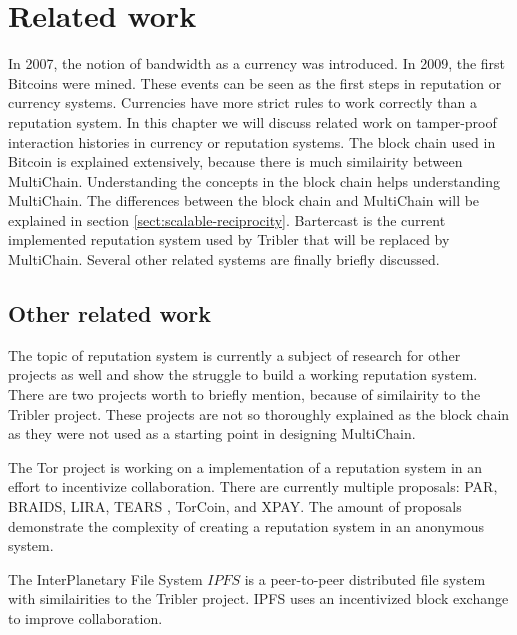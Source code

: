 \chapter{Related work}
In 2007, the notion of bandwidth as a currency was introduced.
In 2009, the first Bitcoins were mined\cite{Blockchain.info-bcs}.
These events can be seen as the first steps in reputation or currency systems.
Currencies have more strict rules to work correctly than a reputation system.
In this chapter we will discuss related work on tamper-proof interaction histories in currency or reputation systems.
The block chain used in Bitcoin is explained extensively,
because there is much similairity between MultiChain.
Understanding the concepts in the block chain helps understanding MultiChain.
The differences between the block chain and MultiChain will be explained in section \ref{sect:scalable-reciprocity}.
Bartercast is the current implemented reputation system used by Tribler that will be replaced by MultiChain.
Several other related systems are finally briefly discussed.





\section{Other related work}
The topic of reputation system is currently a subject of research for other projects as well
and show the struggle to build a working reputation system.
There are two projects worth to briefly mention, because of similairity to the Tribler project.
These projects are not so thoroughly explained as the block chain
as they were not used as a starting point in designing MultiChain.

The Tor project is working on a implementation of a reputation system in an effort to incentivize collaboration\cite{dingledine-torincentive}.
There are currently multiple proposals: PAR\cite{androulaki-torincentive}, BRAIDS\cite{jansen-braid}, LIRA\cite{jansen-lira}, TEARS \cite{jansen-torincentive}, TorCoin\cite{ghosh-torincentive}, and XPAY\cite{chen-torincentive}.
The amount of proposals demonstrate the complexity of creating a reputation system in an anonymous system.

The InterPlanetary File System \(IPFS\) is a peer-to-peer distributed file system with similairities to the Tribler project.
IPFS uses an incentivized block exchange to improve collaboration\cite{benet-ipfs}.